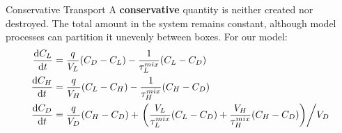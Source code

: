 \documentclass[aspectratio=169]{beamer}
\newcommand{\dv}[2]{\frac{\mathrm{d}#1}{\mathrm{d}#2}}
\begin{document}
\begin{frame}{Conservative Transport}
    A \textbf{conservative} quantity is neither created nor destroyed. The total amount in the system remains constant, although model processes can partition it unevenly between boxes. For our model:
    \begin{align*}
    \dv{C_L}{t} &= \frac{q}{V_L} (C_D - C_L) - \frac{1}{\tau^{mix}_L} ( C_L - C_D ) \\
    \dv{C_H}{t} &= \frac{q}{V_H} (C_L - C_H) - \frac{1}{\tau^{mix}_H} ( C_H - C_D ) \\
    \dv{C_D}{t} &= \frac{q}{V_D} (C_H - C_D) +  \left. \left( \frac{V_L}{\tau^{mix}_L} ( C_L - C_D ) + \frac{V_H}{\tau^{mix}_H} ( C_H - C_D ) \right) \middle/ V_D \right.
    \end{align*}
\end{frame}
\end{document}
